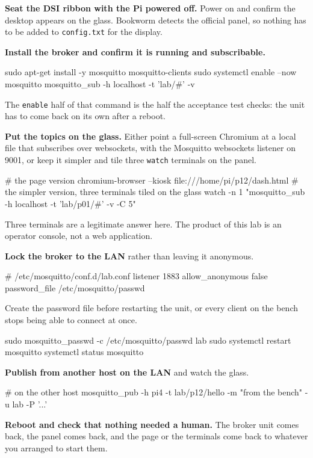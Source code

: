 \begin{steps}
\item \textbf{Seat the DSI ribbon with the Pi powered off.} Power on and confirm the desktop appears on the glass. Bookworm detects the official panel, so nothing has to be added to \texttt{config.txt} for the display.

\item \textbf{Install the broker and confirm it is running and subscribable.}
\begin{shellcode}
sudo apt-get install -y mosquitto mosquitto-clients
sudo systemctl enable --now mosquitto
mosquitto_sub -h localhost -t 'lab/#' -v
\end{shellcode}
The \texttt{enable} half of that command is the half the acceptance test checks: the unit has to come back on its own after a reboot.

\item \textbf{Put the topics on the glass.} Either point a full-screen Chromium at a local file that subscribes over websockets, with the Mosquitto websockets listener on 9001, or keep it simpler and tile three \texttt{watch} terminals on the panel.
\begin{shellcode}
# the page version
chromium-browser --kiosk file:///home/pi/p12/dash.html
# the simpler version, three terminals tiled on the glass
watch -n 1 "mosquitto_sub -h localhost -t 'lab/p01/#' -v -C 5"
\end{shellcode}
Three terminals are a legitimate answer here. The product of this lab is an operator console, not a web application.

\item \textbf{Lock the broker to the LAN} rather than leaving it anonymous.
\begin{plaincode}
# /etc/mosquitto/conf.d/lab.conf
listener 1883
allow_anonymous false
password_file /etc/mosquitto/passwd
\end{plaincode}
Create the password file before restarting the unit, or every client on the bench stops being able to connect at once.
\begin{shellcode}
sudo mosquitto_passwd -c /etc/mosquitto/passwd lab
sudo systemctl restart mosquitto
systemctl status mosquitto
\end{shellcode}

\item \textbf{Publish from another host on the LAN} and watch the glass.
\begin{shellcode}
# on the other host
mosquitto_pub -h pi4 -t lab/p12/hello -m "from the bench" -u lab -P '...'
\end{shellcode}

\item \textbf{Reboot and check that nothing needed a human.} The broker unit comes back, the panel comes back, and the page or the terminals come back to whatever you arranged to start them.
\end{steps}

